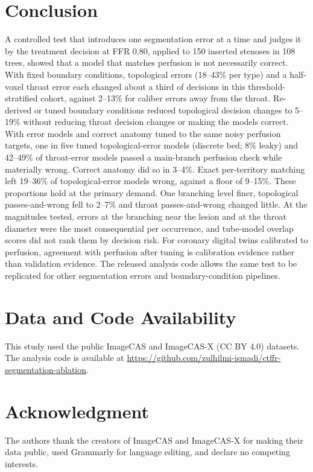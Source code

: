 \documentclass[journal,twoside,web]{ieeecolor}
\begin{document}
\section{Conclusion}
A controlled test that introduces one segmentation error at a time and judges it by the treatment decision at FFR 0.80,
applied to 150 inserted stenoses in 108 trees, showed that a model that matches perfusion is not necessarily correct. With fixed boundary conditions, topological errors (18--43\% per type) and a half-voxel throat error each changed about a third of decisions in this threshold-stratified cohort, against 2--13\% for caliber errors away from the throat. Re-derived or tuned boundary conditions reduced topological decision changes to 5--19\% without reducing throat decision changes or making the models correct. With error models and correct anatomy tuned to the same noisy perfusion targets, one in five tuned topological-error models (discrete bed; 8\% leaky) and 42--49\% of throat-error models passed a main-branch perfusion check while materially wrong. Correct anatomy did so in 3--4\%. Exact per-territory matching left 19--36\% of topological-error models wrong, against a floor of 9--15\%. These proportions hold at the primary demand. One branching level finer, topological passes-and-wrong fell to 2--7\% and throat passes-and-wrong changed little. At the magnitudes tested, errors at the branching near the lesion and at the throat diameter were the most consequential per occurrence, and tube-model overlap scores did not rank them by decision risk.
For coronary digital twins calibrated to perfusion, agreement with perfusion after tuning is calibration evidence
rather than validation evidence. The released analysis code allows the same test to be replicated for other segmentation errors and boundary-condition pipelines.

\section*{Data and Code Availability}
This study used the public ImageCAS \cite{zeng2023} and ImageCAS-X \cite{imagecasx_data} (CC BY 4.0) datasets. The analysis code is available at \url{https://github.com/zulhilmi-ismadi/ctffr-segmentation-ablation}.

\section*{Acknowledgment}
The authors thank the creators of ImageCAS and ImageCAS-X for making their data public, used Grammarly for language editing, and declare no competing interests.



\end{document}
